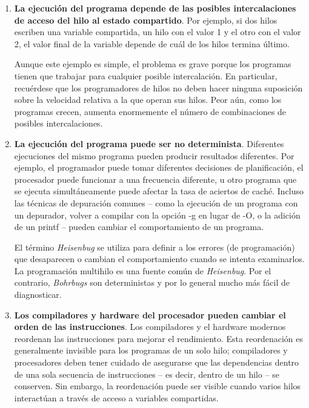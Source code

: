 \documentclass[10pt]{book}
\begin{document}
\begin{enumerate}
\item \textbf{La ejecución del programa depende de las posibles intercalaciones de acceso del hilo al estado compartido}. Por ejemplo, si dos hilos escriben una variable compartida, un hilo con el valor 1 y el otro con el valor 2, el valor final de la variable depende de cuál de los hilos termina último.

Aunque este ejemplo es simple, el problema es grave porque los programas tienen que trabajar para cualquier posible intercalación. En particular, recuérdese que los programadores de hilos no deben hacer ninguna suposición sobre la velocidad relativa a la que operan sus hilos. Peor aún, como los programas crecen, aumenta enormemente el número de combinaciones de posibles intercalaciones.

\item \textbf{La ejecución del programa puede ser no determinista}. Diferentes ejecuciones del mismo programa pueden producir resultados diferentes. Por ejemplo, el programador puede tomar diferentes decisiones de planificación, el procesador puede funcionar a una frecuencia diferente, u otro programa que se ejecuta simultáneamente puede afectar la tasa de aciertos de caché. Incluso las técnicas de depuración comunes -- como la ejecución de un programa con un depurador, volver a compilar con la opción {\mf -g} en lugar de {\mf -O}, o la adición de un {\mf printf} -- pueden cambiar el comportamiento de un programa.

El término \textit{Heisenbug} se utiliza para definir a los errores (de programación) que desaparecen o cambian el comportamiento cuando se intenta examinarlos. La programación multihilo es una fuente común de \textit{Heisenbug}. Por el contrario, \textit{Bohrbugs} son deterministas y por lo general mucho más fácil de diagnosticar.

\item \textbf{Los compiladores y hardware del procesador pueden cambiar el orden de las instrucciones}. Los compiladores y el hardware modernos reordenan las instrucciones para mejorar el rendimiento. Esta reordenación es generalmente invisible para los programas de un solo hilo; compiladores y procesadores deben tener cuidado de asegurarse que las dependencias dentro de una sola secuencia de instrucciones -- es decir, dentro de un hilo -- se conserven. Sin embargo, la reordenación puede ser visible cuando varios hilos interactúan a través de acceso a variables compartidas.
\end{enumerate}
\end{document}
